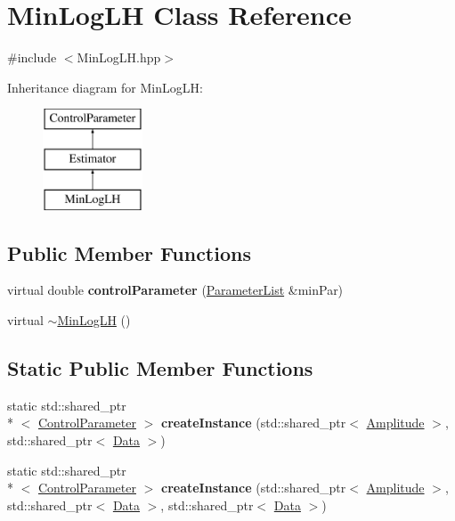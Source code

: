 \hypertarget{class_min_log_l_h}{\section{Min\-Log\-L\-H Class Reference}
\label{class_min_log_l_h}
}


{\ttfamily \#include $<$Min\-Log\-L\-H.\-hpp$>$}

Inheritance diagram for Min\-Log\-L\-H\-:\begin{figure}[H]
\begin{center}
\leavevmode
\includegraphics[height=3.000000cm]{class_min_log_l_h}
\end{center}
\end{figure}
\subsection*{Public Member Functions}
\begin{DoxyCompactItemize}
\item 
\hypertarget{class_min_log_l_h_a232569dd1c39a9c8c37d0a3dac55a41c}{virtual double {\bfseries control\-Parameter} (\hyperlink{class_parameter_list}{Parameter\-List} \&min\-Par)}\label{class_min_log_l_h_a232569dd1c39a9c8c37d0a3dac55a41c}

\item 
virtual \hyperlink{class_min_log_l_h_adae6cb73f0f9922a94adf7bfd0d33f27}{$\sim$\-Min\-Log\-L\-H} ()
\end{DoxyCompactItemize}
\subsection*{Static Public Member Functions}
\begin{DoxyCompactItemize}
\item 
\hypertarget{class_min_log_l_h_a7f9371def478b503f1fd37eb919295d4}{static std\-::shared\-\_\-ptr\\*
$<$ \hyperlink{class_control_parameter}{Control\-Parameter} $>$ {\bfseries create\-Instance} (std\-::shared\-\_\-ptr$<$ \hyperlink{class_amplitude}{Amplitude} $>$, std\-::shared\-\_\-ptr$<$ \hyperlink{class_data}{Data} $>$)}\label{class_min_log_l_h_a7f9371def478b503f1fd37eb919295d4}

\item 
\hypertarget{class_min_log_l_h_a4bfe70674a1486a7d37228f393bda13e}{static std\-::shared\-\_\-ptr\\*
$<$ \hyperlink{class_control_parameter}{Control\-Parameter} $>$ {\bfseries create\-Instance} (std\-::shared\-\_\-ptr$<$ \hyperlink{class_amplitude}{Amplitude} $>$, std\-::shared\-\_\-ptr$<$ \hyperlink{class_data}{Data} $>$, std\-::shared\-\_\-ptr$<$ \hyperlink{class_data}{Data} $>$)}\label{class_min_log_l_h_a4bfe70674a1486a7d37228f393bda13e}

\end{DoxyCompactItemize}
